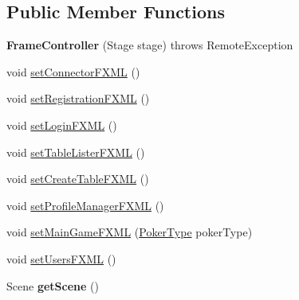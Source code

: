 \subsection*{Public Member Functions}
\begin{DoxyCompactItemize}
\item 
\hypertarget{classhu_1_1elte_1_1bfw1p6_1_1poker_1_1client_1_1controller_1_1main_1_1_frame_controller_a00d2b4af2e81cb9c8e029f0a3b7de84d}{}{\bfseries Frame\+Controller} (Stage stage)  throws Remote\+Exception \label{classhu_1_1elte_1_1bfw1p6_1_1poker_1_1client_1_1controller_1_1main_1_1_frame_controller_a00d2b4af2e81cb9c8e029f0a3b7de84d}

\item 
void \hyperlink{classhu_1_1elte_1_1bfw1p6_1_1poker_1_1client_1_1controller_1_1main_1_1_frame_controller_a1e4c0b7e383007369eeec09e98280a5b}{set\+Connector\+F\+X\+M\+L} ()
\item 
void \hyperlink{classhu_1_1elte_1_1bfw1p6_1_1poker_1_1client_1_1controller_1_1main_1_1_frame_controller_a3c6d525fb457676de08de7c0bee3798d}{set\+Registration\+F\+X\+M\+L} ()
\item 
void \hyperlink{classhu_1_1elte_1_1bfw1p6_1_1poker_1_1client_1_1controller_1_1main_1_1_frame_controller_af983051d8fcab7a31068f71870b88460}{set\+Login\+F\+X\+M\+L} ()
\item 
void \hyperlink{classhu_1_1elte_1_1bfw1p6_1_1poker_1_1client_1_1controller_1_1main_1_1_frame_controller_a23c03c8201e6be0b2e55bcb5062021e7}{set\+Table\+Lister\+F\+X\+M\+L} ()
\item 
void \hyperlink{classhu_1_1elte_1_1bfw1p6_1_1poker_1_1client_1_1controller_1_1main_1_1_frame_controller_a590ea637adfde9f506dddae1b56890be}{set\+Create\+Table\+F\+X\+M\+L} ()
\item 
void \hyperlink{classhu_1_1elte_1_1bfw1p6_1_1poker_1_1client_1_1controller_1_1main_1_1_frame_controller_af821e9f79046748d6a19358b35695dcb}{set\+Profile\+Manager\+F\+X\+M\+L} ()
\item 
void \hyperlink{classhu_1_1elte_1_1bfw1p6_1_1poker_1_1client_1_1controller_1_1main_1_1_frame_controller_acf3a87759320bf33064589a57c8cf86d}{set\+Main\+Game\+F\+X\+M\+L} (\hyperlink{enumhu_1_1elte_1_1bfw1p6_1_1poker_1_1model_1_1entity_1_1_poker_type}{Poker\+Type} poker\+Type)
\item 
void \hyperlink{classhu_1_1elte_1_1bfw1p6_1_1poker_1_1client_1_1controller_1_1main_1_1_frame_controller_aff56bb5e28620b422513225597663186}{set\+Users\+F\+X\+M\+L} ()
\item 
\hypertarget{classhu_1_1elte_1_1bfw1p6_1_1poker_1_1client_1_1controller_1_1main_1_1_frame_controller_a2f60ac4d4fa1d49c1e9ec27f15e8ff06}{}Scene {\bfseries get\+Scene} ()\label{classhu_1_1elte_1_1bfw1p6_1_1poker_1_1client_1_1controller_1_1main_1_1_frame_controller_a2f60ac4d4fa1d49c1e9ec27f15e8ff06}

\end{DoxyCompactItemize}


